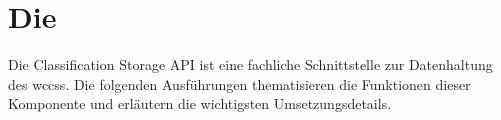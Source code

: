 \section{Die {\classificationStorageAPI}}
    \label{section:solutionDetailsStorageAPI}
    Die Classification Storage API ist eine fachliche Schnittstelle zur Datenhaltung des \glspl{wccs}.
    Die folgenden Ausführungen thematisieren die Funktionen dieser Komponente und erläutern die wichtigsten Umsetzungsdetails.

    
    
    
    
